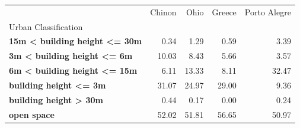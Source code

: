 \begin{tabular}{lrrrr}
\toprule
 & Chinon & Ohio & Greece & Porto Alegre \\
Urban Classification &  &  &  &  \\
\midrule
\textbf{15m < building height <= 30m} & 0.34 & 1.29 & 0.59 & 3.39 \\
\textbf{3m < building height <= 6m} & 10.03 & 8.43 & 5.66 & 3.57 \\
\textbf{6m < building height <= 15m} & 6.11 & 13.33 & 8.11 & 32.47 \\
\textbf{building height <= 3m} & 31.07 & 24.97 & 29.00 & 9.36 \\
\textbf{building height > 30m} & 0.44 & 0.17 & 0.00 & 0.24 \\
\textbf{open space} & 52.02 & 51.81 & 56.65 & 50.97 \\
\bottomrule
\end{tabular}
